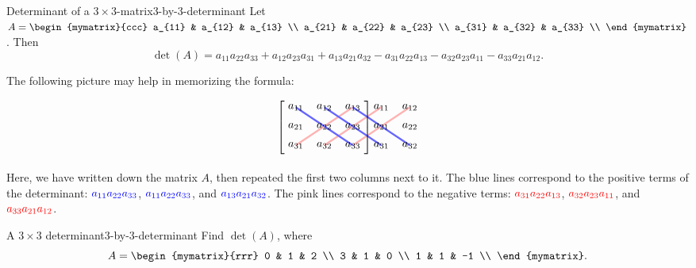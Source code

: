 \begin{definition}{Determinant of a $3\times 3$-matrix}{3-by-3-determinant}
  Let $A=\begin{mymatrix}{ccc}
    a_{11} & a_{12} & a_{13} \\
    a_{21} & a_{22} & a_{23} \\
    a_{31} & a_{32} & a_{33} \\
  \end{mymatrix}$. Then
  \begin{equation*}
    \det(A)
    = a_{11}a_{22}a_{33}
    + a_{12}a_{23}a_{31}
    + a_{13}a_{21}a_{32}
    - a_{31}a_{22}a_{13}
    - a_{32}a_{23}a_{11}
    - a_{33}a_{21}a_{12}.
  \end{equation*}
\end{definition}

The following picture may help in memorizing the formula:
\begin{equation*}
  \begin{tikzpicture}[yscale=0.6,xscale=0.9]
    \draw[ultra thick,red!30] (1,-3) -- (3,-1);
    \draw[ultra thick,red!30] (2,-3) -- (4,-1);
    \draw[ultra thick,red!30] (3,-3) -- (5,-1);
    \draw[ultra thick,blue!60] (1,-1) -- (3,-3);
    \draw[ultra thick,blue!60] (2,-1) -- (4,-3);
    \draw[ultra thick,blue!60] (3,-1) -- (5,-3);
    \foreach\i in {1,2,3} {
      \foreach\j in {1,2,3} {
        \path (\j,-\i) node {$a_{\i\j}$};
      }
    }
    \foreach\i in {1,2,3} {
      \foreach\j in {1,2} {
        \path (\j,-\i) + (3,0) node {$a_{\i\j}$};
      }
    }
    \draw(0.5,-2) node {$\left[\rule{0mm}{1.0cm}\right.$};
    \draw(3.5,-2) node {$\left.\rule{0mm}{1.0cm}\right]$};
  \end{tikzpicture}
\end{equation*}
Here, we have written down the matrix $A$, then repeated the first two
columns next to it. The blue lines correspond to the positive terms of
the determinant: $\color{blue}a_{11}a_{22}a_{33}$,
$\color{blue}a_{11}a_{22}a_{33}$, and
$\color{blue}a_{13}a_{21}a_{32}$. The pink lines correspond to the
negative terms: $\color{red}a_{31}a_{22}a_{13}$,
$\color{red}a_{32}a_{23}a_{11}$, and $\color{red}a_{33}a_{21}a_{12}$.

\begin{example}{A $3\times 3$ determinant}{3-by-3-determinant}
  Find $\det(A)$, where
  \begin{equation*}
    A = \begin{mymatrix}{rrr}
      0 & 1 & 2 \\
      3 & 1 & 0 \\
      1 & 1 & -1 \\
    \end{mymatrix}.
  \end{equation*}
\end{example}


